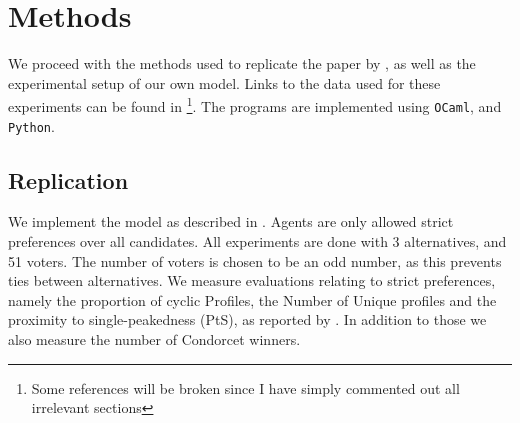 \chapter{Methods}
\label{Methods}

We proceed with the methods used to replicate the paper by \citet{radDeliberationSinglePeakednessCoherent2021}, as well as the experimental setup of our own model. Links to the data used for these experiments can be found in \footnote{Some references will be broken since I have simply commented out all irrelevant sections}. The programs are implemented using \texttt{OCaml}, and \texttt{Python}.


\section{Replication}
We implement the model as described in . Agents are
only allowed strict preferences over all candidates. All experiments are done
with 3 alternatives, and 51 voters. The number of voters is chosen
to be an odd number, as this prevents ties between alternatives. We
measure evaluations relating to strict preferences, namely the proportion
of cyclic Profiles, the Number of Unique profiles and the proximity to
single-peakedness (PtS), as reported by
\citet{radDeliberationSinglePeakednessCoherent2021}. In addition to those we
also measure the number of Condorcet winners.

